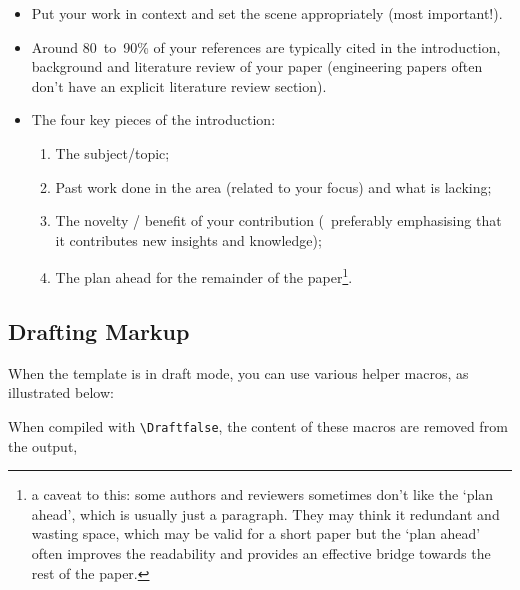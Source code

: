 \begin{itemize}
  \item Put your work in context and set the scene appropriately (most important!).

  \item Around 80~to~90\% of your references are typically cited in the introduction, background and literature review of your paper (engineering papers often don't have an explicit literature review section).

  \item The four key pieces of the introduction:
  \begin{enumerate}
    \item The subject/topic;
    \item Past work done in the area (related to your focus) and what is lacking;
    \item The novelty / benefit of your contribution (\ie~preferably emphasising that it contributes new insights and knowledge);
    \item The plan ahead for the remainder of the paper\footnote{a caveat to this: some authors and reviewers sometimes don't like the `plan ahead', which is usually just a paragraph.  They may think it redundant and wasting space, which may be valid for a short paper but the `plan ahead' often improves the readability and provides an effective bridge towards the rest of the paper.}.
  \end{enumerate}
\end{itemize}






\subsection{Drafting Markup}

When the template is in draft mode, you can use various helper macros, as illustrated below:

      When compiled with \verb|\Draftfalse|, the content of these macros are removed from the output, 



